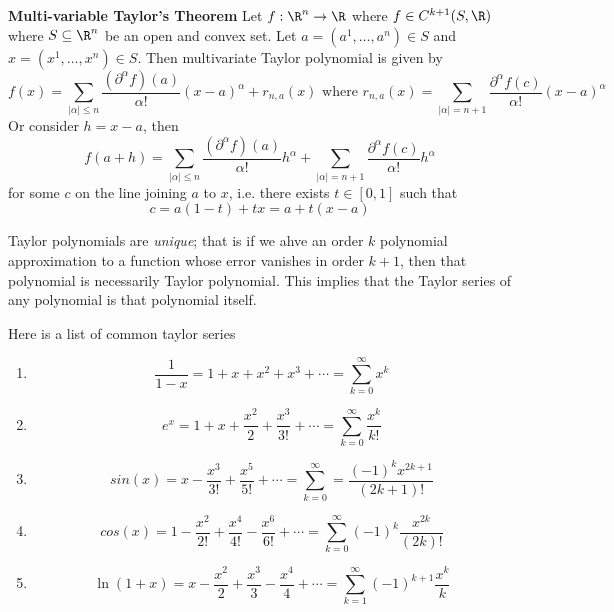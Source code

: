 \documentclass[11pt]{article}
\begin{document}
\begin{theorem}
  \label{Multi-variable Taylor's Theorem} \textbf{Multi-variable Taylor's Theorem} Let $f:\R^n \rightarrow \R$ where $f\in C^{k+1}(S, \R)$ where $S\subseteq \R^n$ be an open and convex set. Let $a = (a^1, \dots, a^n)\in S$ and $x = (x^1,\dots, x^n) \in S$. Then multivariate Taylor polynomial is given by
  \[
    f(x) = \sum_{|\alpha|\leq n} \frac{( \partial^{\alpha} f ) (a)}{\alpha !} (x-a)^{\alpha} + r_{n,a} (x) \text{ where } r_{n,a}(x) = \sum_{|\alpha| = n+1} \frac{\partial^{\alpha} f(c)}{\alpha!} (x-a)^{\alpha}
  \]
  Or consider $h = x - a$, then
  \[
    f(a+h) = \sum_{|\alpha|\leq n} \frac{( \partial^{\alpha} f ) (a)}{\alpha !} h^{\alpha} + \sum_{|\alpha| = n+1} \frac{\partial^{\alpha} f(c)}{\alpha !} h^{\alpha}
  \]
  for some $c$ on the line joining $a$ to $x$, i.e. there exists $t\in [0,1]$ such that
  \[
    c = a(1-t) + tx = a + t(x-a)
  \]
  \begin{rem}
    Taylor polynomials are \textit{unique}; that is if we ahve an order $k$ polynomial approximation to a function whose error vanishes in order $k+1$, then that polynomial is necessarily Taylor polynomial. This implies that the Taylor series of any polynomial is that polynomial itself.
  \end{rem}
\end{theorem}

\begin{defn*}
  Here is a list of common taylor series
  \begin{enumerate}
    \item
    \[
      \frac{1}{1-x} = 1 + x + x^2 + x^3 + \cdots = \sum_{k=0}^{\infty} x^k
    \]
    \item
    \[
      e^x = 1 + x + \frac{x^2}{2} + \frac{x^3}{3!} + \cdots = \sum_{k=0}^{\infty} \frac{x^k}{k!}
    \]
    \item
    \[
      sin(x) = x - \frac{x^3}{3!} + \frac{x^5}{5!} + \cdots = \sum_{k=0}^{\infty} = \frac{(-1)^kx^{2k+1}}{(2k+1)!}
    \]
    \item
    \[
      cos(x) = 1 - \frac{x^2}{2!} + \frac{x^4}{4!} - \frac{x^6}{6!} + \cdots = \sum_{k=0}^{\infty}(-1)^{k} \frac{x^{2k}}{(2k)!}
    \]
    \item
    \[
      \ln (1+x) = x - \frac{x^2}{2} + \frac{x^3}{3} - \frac{x^4}{4} + \cdots = \sum_{k=1}^{\infty} (-1)^{k+1} \frac{x^k}{k}
    \]

  \end{enumerate}
\end{defn*}
\end{document}
